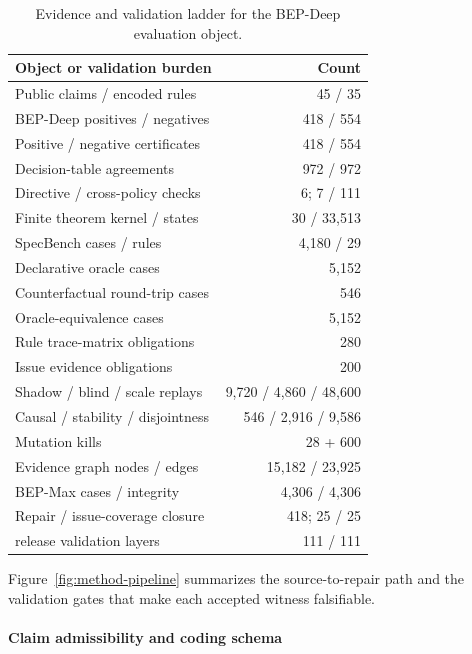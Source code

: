 \documentclass[10pt,conference]{IEEEtran}
\begin{document}
\begin{table}[t]
\centering
\caption{Evidence and validation ladder for the BEP-Deep evaluation object.}
\label{tab:strata}
\begin{tabular}{lr}
\toprule
Object or validation burden & Count \\
\midrule
Public claims / encoded rules & 45 / 35 \\
BEP-Deep positives / negatives & 418 / 554 \\
Positive / negative certificates & 418 / 554 \\
Decision-table agreements & 972 / 972 \\
Directive / cross-policy checks & 6; 7 / 111 \\
Finite theorem kernel / states & 30 / 33,513 \\
SpecBench cases / rules & 4,180 / 29 \\
Declarative oracle cases & 5,152 \\
Counterfactual round-trip cases & 546 \\
Oracle-equivalence cases & 5,152 \\
Rule trace-matrix obligations & 280 \\
Issue evidence obligations & 200 \\
Shadow / blind / scale replays & 9,720 / 4,860 / 48,600 \\
Causal / stability / disjointness & 546 / 2,916 / 9,586 \\
Mutation kills & 28 + 600 \\
Evidence graph nodes / edges & 15,182 / 23,925 \\
BEP-Max cases / integrity & 4,306 / 4,306 \\
Repair / issue-coverage closure & 418; 25 / 25 \\
release validation layers & 111 / 111 \\
\bottomrule
\end{tabular}
\end{table}

Figure~\ref{fig:method-pipeline} summarizes the source-to-repair path and the validation gates that make each accepted witness falsifiable.




\paragraph{Claim admissibility and coding schema}
\end{document}
